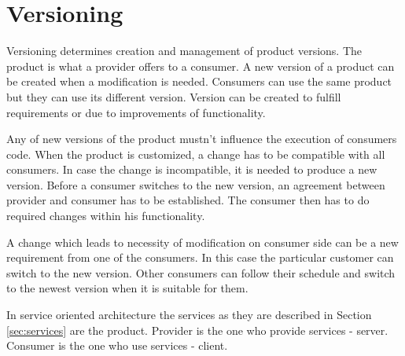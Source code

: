 \chapter{Versioning}
\label{chap:versioning}

Versioning determines creation and management of product versions. The product is what a provider offers to a consumer. A new version of a product can be created when a modification is needed. Consumers can use the same product but they can use its different version. Version can be created to fulfill requirements or due to improvements of functionality. 

Any of new versions of the product mustn't influence the execution of consumers code. When the product is customized, a change has to be compatible with all consumers. In case the change is incompatible, it is needed to produce a new version. Before a consumer switches to the new version, an agreement between provider and consumer has to be established. The consumer then has to do required changes within his functionality.

A change which leads to necessity of modification on consumer side can be a new requirement from one of the consumers. In this case the particular customer can switch to the new version. Other consumers can follow their schedule and switch to the newest version when it is suitable for them. 

In service oriented architecture the services as they are described in Section \ref{sec:services} are the product. Provider is the one who provide services - server. Consumer is the one who use services - client.

